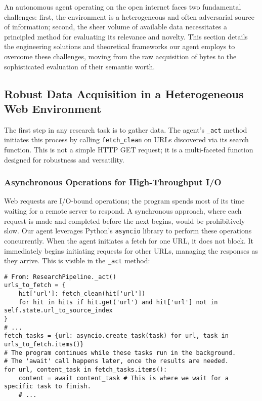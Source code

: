 \documentclass[12pt, a4paper]{article}
\begin{document}
An autonomous agent operating on the open internet faces two fundamental challenges: first, the environment is a heterogeneous and often adversarial source of information; second, the sheer volume of available data necessitates a principled method for evaluating its relevance and novelty. This section details the engineering solutions and theoretical frameworks our agent employs to overcome these challenges, moving from the raw acquisition of bytes to the sophisticated evaluation of their semantic worth.

\subsection{Robust Data Acquisition in a Heterogeneous Web Environment}

The first step in any research task is to gather data. The agent's \verb|_act| method initiates this process by calling \verb|fetch_clean| on URLs discovered via its search function. This is not a simple HTTP GET request; it is a multi-faceted function designed for robustness and versatility.

\subsubsection{Asynchronous Operations for High-Throughput I/O}

Web requests are I/O-bound operations; the program spends most of its time waiting for a remote server to respond. A synchronous approach, where each request is made and completed before the next begins, would be prohibitively slow. Our agent leverages Python's \verb|asyncio| library to perform these operations concurrently. When the agent initiates a fetch for one URL, it does not block. It immediately begins initiating requests for other URLs, managing the responses as they arrive. This is visible in the \verb|_act| method:

\begin{lstlisting}[style=myPython]
# From: ResearchPipeline._act()
urls_to_fetch = {
    hit['url']: fetch_clean(hit['url'])
    for hit in hits if hit.get('url') and hit['url'] not in self.state.url_to_source_index
}
# ...
fetch_tasks = {url: asyncio.create_task(task) for url, task in urls_to_fetch.items()}
# The program continues while these tasks run in the background.
# The 'await' call happens later, once the results are needed.
for url, content_task in fetch_tasks.items():
    content = await content_task # This is where we wait for a specific task to finish.
    # ...
\end{lstlisting}
\end{document}
